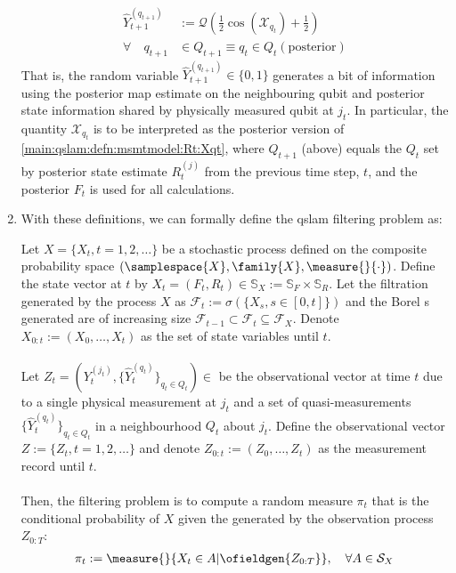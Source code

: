 \begin{enumerate}
\begin{align}
	 	\hat{Y}_{t+1}^{(q_{t+1})}  & := \mathcal{Q}(\frac{1}{2} \cos(\mathcal{X}_{q_t}) + \frac{1}{2}) \label{main:qslam:defn:quasimsmts:1} \\
	 	\forall \quad q_{t+1}& \in Q_{t+1} \equiv q_t \in Q_t (\mathrm{posterior})
	 	\end{align} That is, the random variable $\hat{Y}_{t+1}^{(q_{t+1})} \in \{0,1\}$ generates a bit of information using the posterior map estimate on the neighbouring qubit and posterior state information shared by physically measured qubit at $j_t$. In particular, the quantity $\mathcal{X}_{q_t}$ is to be interpreted as the posterior version of \cref{main:qslam:defn:msmtmodel:Rt:Xqt}, where $ Q_{t+1}$ (above) equals the $Q_t$ set by posterior state estimate $R_t^{(j)}$ from the previous time step, $t$, and the posterior $F_t$ is used for all calculations. 
	\item With these definitions, we can formally define the qslam filtering problem as:
\begin{defn} \label{qslam:filteringprob}
	Let $X = \{X_t, t = 1, 2, \hdots \}$ be a stochastic process defined on the composite probability space $(\samplespace{X}, \family{X}, \measure{{}}{\cdot})$. Define the state vector at $t$  by $X_t = (F_t, R_t) \in \mathbb{S}_{X} := \mathbb{S}_{F} \times \mathbb{S}_{R}$. Let the filtration generated by the process $X$ as $\mathcal{F}_{t} := \sigma(\{X_s, s\in[0, t]\})$ and the Borel \ofield{}s generated  are of increasing size  $\mathcal{F}_{t-1} \subset \mathcal{F}_{t} \subseteq \mathcal{F}_{X}$. Denote  $X_{0:t} := (X_0, \hdots, X_t)$ as the set of state variables until $t$. \\
	\\
	Let $Z_t = (Y_t^{(j_t)}, \{\hat{Y}_t^{(q_t)}\}_{q_t \in Q_t}) \in $ be the observational vector at time $t$ due to a single physical measurement at $j_t$ and a set of quasi-measurements $\{\hat{Y}_t^{(q_t)}\}_{q_t \in Q_t}$ in a neighbourhood $Q_t$ about $j_t$. Define the observational vector $Z := \{ Z_t, t = 1, 2, \hdots \}$ and denote  $Z_{0:t} := (Z_0, \hdots, Z_t)$ as the measurement record until $t$.\\
	\\
	Then, the filtering problem is to compute a random measure $\pi_t$ that is the conditional probability of  $X$ given the \ofield{} generated by the observation process $Z_{0:T}$:
	\begin{align}
	\pi_t &:= \measure{{}}{X_t \in A | \ofieldgen{Z_{0:T}}}, \quad \forall A \in \mathcal{S}_X \\

\end{align}
\end{defn}
\end{enumerate}
